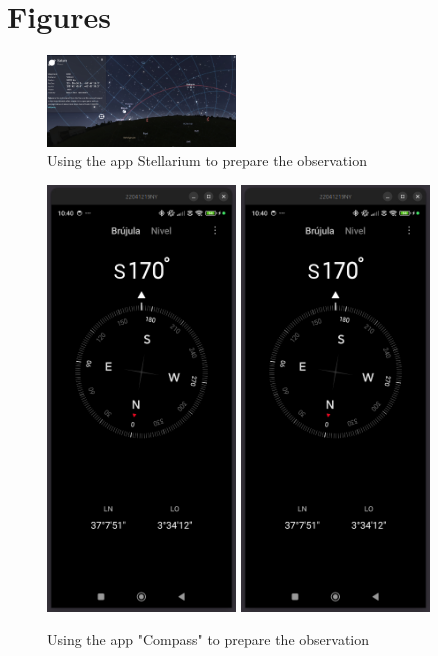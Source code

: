 \documentclass[a4paper,landscape,english,12pt]{article}
\begin{document}
\section{Figures}
	\begin{figure}[hbt]
	\includegraphics[width=5cm]{../Figures/ecliptic.jpg}
	\caption{Using the app Stellarium to prepare the observation}		
	\label{fig:stellarium}
\end{figure} 

\begin{figure}[hbt]
	\includegraphics[width=5cm]{../Figures/compass.jpg}
	\includegraphics[width=5cm]{../Figures/compass.jpg}
	\caption{Using the app "Compass" to prepare the observation}		
	\label{fig:compass}
\end{figure} 
\end{document}
